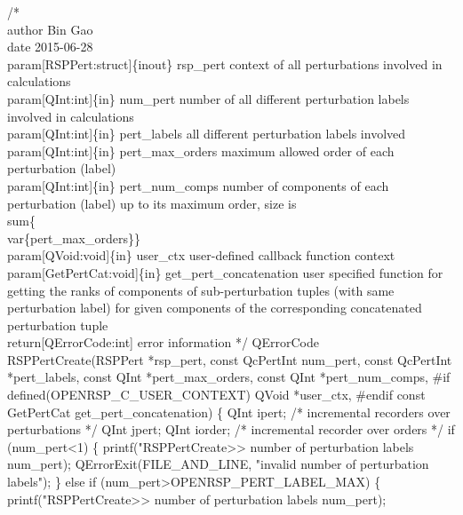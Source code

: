 /*%
    \\author Bin Gao
    \\date 2015-06-28
    \\param[RSPPert:struct]\{inout\} rsp_pert context of all perturbations involved in calculations
    \\param[QInt:int]\{in\} num_pert number of all different perturbation labels involved
        in calculations
    \\param[QInt:int]\{in\} pert_labels all different perturbation labels involved
    \\param[QInt:int]\{in\} pert_max_orders maximum allowed order of each perturbation (label)
    \\param[QInt:int]\{in\} pert_num_comps number of components of each perturbation (label)
        up to its maximum order, size is \\sum\{\\var\{pert_max_orders\}\}
    \\param[QVoid:void]\{in\} user_ctx user-defined callback function context
    \\param[GetPertCat:void]\{in\} get_pert_concatenation user specified function for
        getting the ranks of components of sub-perturbation tuples (with same
        perturbation label) for given components of the corresponding concatenated
        perturbation tuple
    \\return[QErrorCode:int] error information
*/
QErrorCode RSPPertCreate(RSPPert *rsp_pert,
                         const QcPertInt num_pert,
                         const QcPertInt *pert_labels,
                         const QInt *pert_max_orders,
                         const QInt *pert_num_comps,
#if defined(OPENRSP_C_USER_CONTEXT)
                         QVoid *user_ctx,
#endif
                         const GetPertCat get_pert_concatenation)
\{
    QInt ipert;   /* incremental recorders over perturbations */
    QInt jpert;
    QInt iorder;  /* incremental recorder over orders */
    if (num_pert<1) \{
        printf("RSPPertCreate>> number of perturbation labels %
               num_pert);
        QErrorExit(FILE_AND_LINE, "invalid number of perturbation labels");
    \}
    else if (num_pert>OPENRSP_PERT_LABEL_MAX) \{
        printf("RSPPertCreate>> number of perturbation labels %
               num_pert);
